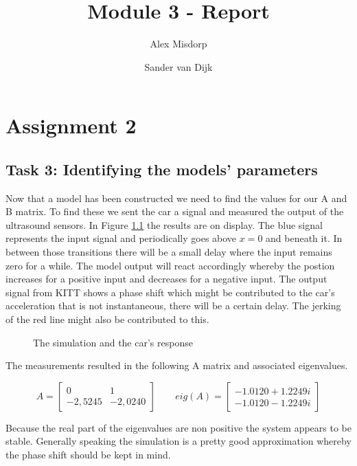 \documentclass[final]{scrreprt} %
\title{Module 3 - Report}
\author{Alex {Misdorp} \and Sander {van Dijk}}
\begin{document}
\chapter{Assignment 2}
\section*{Task 3: Identifying the models' parameters}

Now that a model has been constructed we need to find the values for our A and B matrix. To find these we sent the car a signal and measured the output of the ultrasound sensors. In Figure \ref{fig:KITT-input-output-model} the results are on display.
The blue signal represents the input signal and periodically goes above $x=0$ and beneath it. In between those transitions there will be a small delay where the input remains zero for a while. The model output will react accordingly whereby the postion increases for a positive input and decreases for a negative input.
The output signal from KITT shows a phase shift which might be contributed to the car's acceleration that is not instantaneous, there will be a certain delay. The jerking of the red line might also be contributed to this.

\begin{figure}[H]
	\centering
    	\setlength\figureheight{4cm}
    	\setlength{}
    	    	
    	\caption{The simulation and the car's response}
    	\label{fig:KITT-input-output-model}
\end{figure}

The measurements resulted in the following A matrix and associated eigenvalues.

\begin{equation}
A=
\begin{bmatrix}
  0 & 1 \\
  -2,5245 & -2,0240
 \end{bmatrix}
\qquad
eig(A)=
\begin{bmatrix}
 -1.0120 + 1.2249i \\
  -1.0120 - 1.2249i
 \end{bmatrix}
\end{equation}

Because the real part of the eigenvalues are non positive the system appears to be stable. Generally speaking the simulation is a pretty good approximation whereby the phase shift should be kept in mind.
\end{document}
